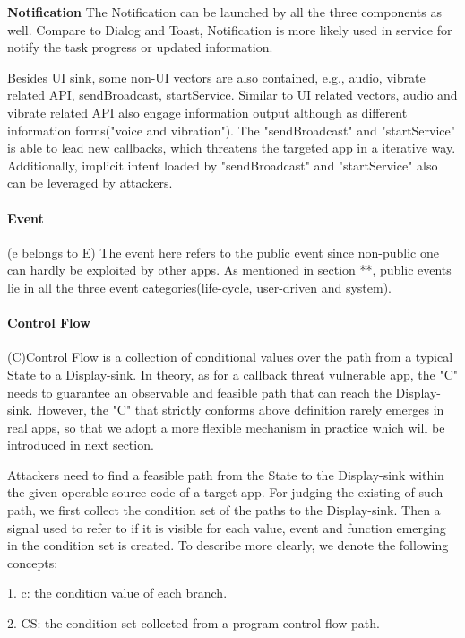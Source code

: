 \documentclass{sig-alternate-05-2015}
\begin{document}
\textbf{Notification}
The Notification can be launched by all the three components as well. Compare to Dialog and Toast, Notification is more likely used in service for notify the task progress or updated information. 



Besides UI sink, some non-UI vectors are also contained, e.g., audio, vibrate related API, sendBroadcast, startService. Similar to UI related vectors, audio and vibrate related API also engage information output although as different information forms("voice and vibration"). The "sendBroadcast" and "startService" is able to lead new callbacks, which threatens the targeted app in a iterative way. Additionally, implicit intent loaded by "sendBroadcast" and "startService" also can be leveraged by attackers.

\paragraph{Event}

(e belongs to E) The event here refers to the public event since non-public one can hardly be exploited by other apps. As mentioned in section **, public events lie in all the three event categories(life-cycle, user-driven and system).

\paragraph{Control Flow}

(C)Control Flow is a collection of conditional values over the path from a typical State to a Display-sink. In theory, as for a callback threat vulnerable app, the "C" needs to guarantee an observable and feasible path that can reach the Display-sink. However, the "C" that strictly conforms above definition rarely emerges in real apps, so that we adopt a more flexible mechanism in practice which will be introduced in next section.  

Attackers need to find a feasible path from the State to the Display-sink within the given operable source code of a target app. For judging the existing of such path, we first collect the condition set of the paths to the Display-sink. Then a signal used to refer to if it is visible for each value, event and function emerging in the condition set is created. To describe more clearly, we denote the following concepts:

1. c: the condition value of each branch.

2. CS: the condition set collected from a program control flow path.
\end{document}
